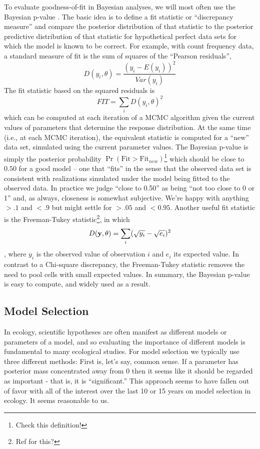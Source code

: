 To evaluate goodness-of-fit in Bayesian analyses, we will most often
use the Bayesian p-value \citep{gelman_etal:1996}.  The basic idea is to define
a fit statistic or ``discrepancy measure'' and compare the posterior distribution of that
statistic to the posterior predictive distribution of that statistic
for hypothetical perfect data sets for which the model is known to be correct. For
example, with count frequency data, a standard measure of fit is the
sum of squares of the ``Pearson residuals'',
\[
D(y_i,\theta) = \frac{(y_i - E(y_i))^{2}}{Var( y_{i} )}
\]
The fit statistic based on the squared residuals is
\[
FIT = \sum_{i} D(y_{i},\theta)^{2}
\]
which can be computed at each iteration of a MCMC algorithm given the
current values of parameters that determine the
 response distribution.  At the same time (i.e., at each MCMC
 iteration),
the equivalent statistic is computed for a
``new'' data set, simulated using the current parameter values. The
Bayesian p-value is simply the posterior probability $\Pr(\mbox{Fit} >
\mbox{Fit}_{new})$\footnote{Check this definition!}
 which should be close to $0.50$ for a good model -- one that
 ``fits'' in the sense that the observed data set is
 consistent with realizations simulated under the model being fitted
 to the observed data. In practice
we judge ``close to 0.50'' as being ``not too close to 0 or 1'' and,
as always, closeness is somewhat subjective. We're happy with anything
$>.1$ and $<.9$ but might settle for $>.05$ and $<0.95$. 
Another useful fit statistic is the Freeman-Tukey
statistic\footnote{Ref for this?}, in which
\[
D({\bf y},\theta) = \sum_{i} ( \sqrt{y_{i}} - \sqrt{e_{i}} )^2
\]
\citep{brooks_etal:2000}, where $y_{i}$ is the observed value of
observation $i$ and $e_{i}$ its expected value. In contrast to a
Chi-square discrepancy, the Freeman-Tukey statistic removes the need
to pool cells with small expected values.
In summary,
the Bayesian p-value is easy to compute,
and widely used as a result.


\subsection{Model Selection }

In ecology, scientific hypotheses are often manifest as different models or parameters
 of a model, and so
evaluating the importance of different models is fundamental 
to many ecological studies.
For model selection we typically use three different methods: First
is, let's say, common sense. If a parameter has posterior mass
concentrated away from 0 then it seems like it should be regarded as
important - that is, it is ``significant.''  This approach seems to
have fallen out of favor with all of the interest over the last 10 or
15 years on model selection in ecology. It seems reasonable to us.


